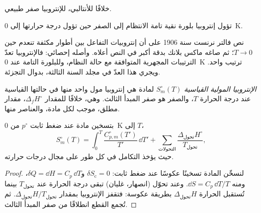 خلافًا للأنتالبي، للإنتروبيا صفر طبيعي.

\begin{theorem}\label{thm:b2:reaction-free-energy:third-law}
تؤول إنتروبيا بلورة نقية تامة الانتظام إلى الصفر حين تؤول درجة حرارتها إلى
\qty{0}{K}.
\end{theorem}
\admitted

\begin{remark}\label{rem:b2:reaction-free-energy:third-law}
نص فالتر نرنست سنة 1906 على أن إنتروبيات التفاعل بين أطوار مكثفة تنعدم
حين $T \to 0$؛ ثم صاغه ماكس بلانك بدقة أكبر في النص أعلاه. وأصله
إحصائي: فالإنتروبيا تعدّ الترتيبات المجهرية المتوافقة مع حالة النظام،
وللبلورة التامة عند \qty{0}{K} ترتيب واحد. ويجري هذا العدّ في مجلد السنة
الثالثة، بدوال التجزئة.
\end{remark}

\begin{definition}\label{def:b2:reaction-free-energy:standard-entropy}
\emph{الإنتروبيا المولية القياسية}
$S^\circ_m(T)$ لمادة هي إنتروبيا مول واحد منها في حالتها القياسية عند درجة
الحرارة $T$، والصفر هو صفر المبدأ الثالث. وهي، خلافًا للمقدار
$\Delta_f H^\circ$، مقدار مطلق، موجب لكل مادة، والعناصر منها.
\end{definition}

\begin{proposition}\label{prop:b2:reaction-free-energy:absolute-entropy}
بتسخين مادة عند ضغط ثابت $p^\circ$ من \qty{0}{K} إلى $T$،
\[
  S^\circ_m(T) = \int_0^T\frac{C^\circ_{p,m}(T')}{T'}\,\dd T' +
  \sum_{\text{التحولات}}\frac{\Delta_{\text{تحول}}H^\circ}{T_{\text{تحول}}} ,
\]
حيث يؤخذ التكامل في كل طور على مجال درجات حرارته.
\end{proposition}

\begin{proof}
لنسخّن المادة تسخينًا عكوسًا عند ضغط ثابت: $\delta S_{\text{c}} =
0$ و$\delta Q = \dd H = C_p\,\dd T$، ومنه $\dd S = C_p\,\dd T/T$. وعند
تحوّل (انصهار، غليان) تبقى درجة الحرارة عند $T_{\text{تحول}}$
بينما تُستقبل الحرارة $\Delta_{\text{تحول}}H$ بطريقة عكوسة: فتقفز الإنتروبيا
بمقدار $\Delta_{\text{تحول}}H/T_{\text{تحول}}$. ثم تُجمع القطع انطلاقًا من
صفر المبدأ الثالث.
\end{proof}

